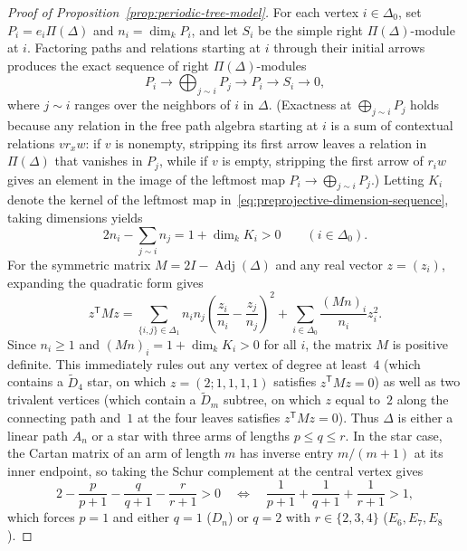 \begin{proof}[Proof of Proposition~\ref{prop:periodic-tree-model}]
For each vertex $i\in\Delta_0$, set $P_i=e_i\Pi(\Delta)$ and $n_i=\dim_k P_i$, and let $S_i$ be the simple right $\Pi(\Delta)$-module at $i$. Factoring paths and relations starting at $i$ through their initial arrows produces the exact sequence of right $\Pi(\Delta)$-modules
\begin{equation}
  P_i\longrightarrow\bigoplus_{j\sim i}P_j\longrightarrow P_i\longrightarrow S_i\longrightarrow0,
  \label{eq:preprojective-dimension-sequence}
\end{equation}
where $j\sim i$ ranges over the neighbors of $i$ in $\Delta$. (Exactness at $\bigoplus_{j\sim i}P_j$ holds because any relation in the free path algebra starting at $i$ is a sum of contextual relations $v r_x w$: if $v$ is nonempty, stripping its first arrow leaves a relation in $\Pi(\Delta)$ that vanishes in $P_j$, while if $v$ is empty, stripping the first arrow of $r_i w$ gives an element in the image of the leftmost map $P_i\to\bigoplus_{j\sim i}P_j$.) Letting $K_i$ denote the kernel of the leftmost map in~\eqref{eq:preprojective-dimension-sequence}, taking dimensions yields
\[
  2n_i-\sum_{j\sim i}n_j=1+\dim_k K_i>0\qquad(i\in\Delta_0).
\]
For the symmetric matrix $M=2I-\operatorname{Adj}(\Delta)$ and any real vector $z=(z_i)$, expanding the quadratic form gives
\[
  z^{\mathsf T}Mz=\sum_{\{i,j\}\in\Delta_1}n_in_j\left(\frac{z_i}{n_i}-\frac{z_j}{n_j}\right)^2+\sum_{i\in\Delta_0}\frac{(Mn)_i}{n_i}z_i^2.
\]
Since $n_i\geq1$ and $(Mn)_i=1+\dim_k K_i>0$ for all $i$, the matrix $M$ is positive definite. This immediately rules out any vertex of degree at least~$4$ (which contains a $\widetilde D_4$ star, on which $z=(2;1,1,1,1)$ satisfies $z^{\mathsf T}Mz=0$) as well as two trivalent vertices (which contain a $\widetilde D_m$ subtree, on which $z$ equal to~$2$ along the connecting path and~$1$ at the four leaves satisfies $z^{\mathsf T}Mz=0$). Thus $\Delta$ is either a linear path $A_n$ or a star with three arms of lengths $p\leq q\leq r$. In the star case, the Cartan matrix of an arm of length $m$ has inverse entry $m/(m+1)$ at its inner endpoint, so taking the Schur complement at the central vertex gives
\[
  2-\frac{p}{p+1}-\frac{q}{q+1}-\frac{r}{r+1}>0\quad\Longleftrightarrow\quad
  \frac1{p+1}+\frac1{q+1}+\frac1{r+1}>1,
\]
which forces $p=1$ and either $q=1$ ($D_n$) or $q=2$ with $r\in\{2,3,4\}$ ($E_6,E_7,E_8$).


\end{proof}
